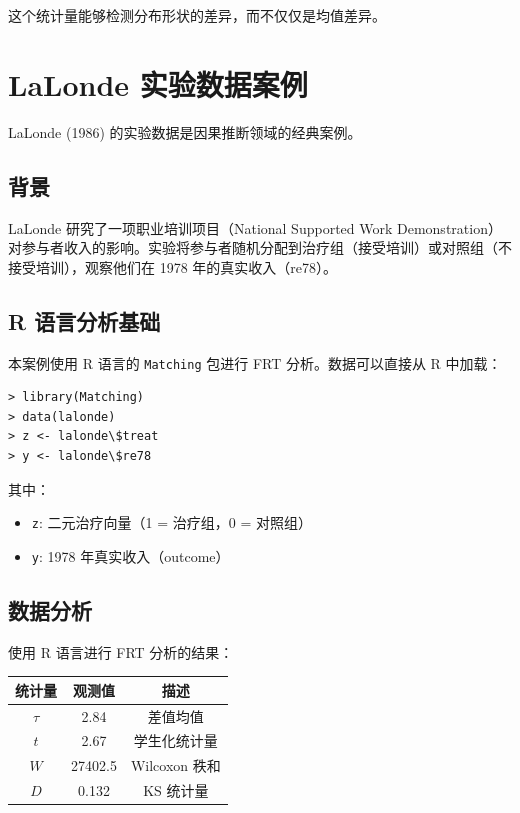 这个统计量能够检测分布形状的差异，而不仅仅是均值差异。

\section{LaLonde 实验数据案例}

LaLonde (1986) 的实验数据是因果推断领域的经典案例。

\subsection{背景}

LaLonde 研究了一项职业培训项目（National Supported Work Demonstration）对参与者收入的影响。实验将参与者随机分配到治疗组（接受培训）或对照组（不接受培训），观察他们在 1978 年的真实收入（re78）。

\subsection{R 语言分析基础}

本案例使用 R 语言的 \texttt{Matching} 包进行 FRT 分析。数据可以直接从 R 中加载：

\begin{verbatim}
> library(Matching)
> data(lalonde)
> z <- lalonde\$treat
> y <- lalonde\$re78
\end{verbatim}

其中：
\begin{itemize}
  \item \texttt{z}: 二元治疗向量（1 = 治疗组，0 = 对照组）
  \item \texttt{y}: 1978 年真实收入（outcome）
\end{itemize}

\subsection{数据分析}

使用 R 语言进行 FRT 分析的结果：

\begin{center}
\begin{tabular}{c|c|c}
\hline
统计量 & 观测值 & 描述 \\
\hline
$\hat{\tau}$ & 2.84 & 差值均值 \\
$t$ & 2.67 & 学生化统计量 \\
$W$ & 27402.5 & Wilcoxon 秩和 \\
$D$ & 0.132 & KS 统计量 \\
\hline
\end{tabular}
\end{center}

